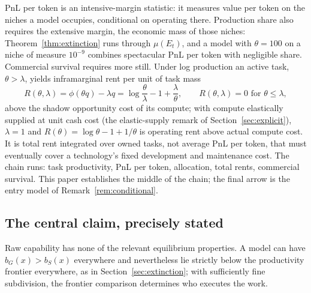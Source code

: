 \documentclass[11pt]{article}
\theoremstyle{definition}
\theoremstyle{remark}
\begin{document}
PnL per token is an intensive-margin statistic: it measures value per token on the niches a model occupies, conditional on operating there. Production share also requires the extensive margin, the economic mass of those niches: Theorem~\ref{thm:extinction} runs through $\mu(E_t)$, and a model with $\theta = 100$ on a niche of measure $10^{-9}$ combines spectacular PnL per token with negligible share. Commercial survival requires more still. Under log production an active task, $\theta > \lambda$, yields inframarginal rent per unit of task mass
\begin{equation}
R(\theta, \lambda) = \phi(\theta q) - \lambda q = \log\frac{\theta}{\lambda} - 1 + \frac{\lambda}{\theta},
\qquad
R(\theta, \lambda) = 0 \text{ for } \theta \le \lambda,
\end{equation}
above the shadow opportunity cost of its compute; with compute elastically supplied at unit cash cost (the elastic-supply remark of Section~\ref{sec:explicit}), $\lambda = 1$ and $R(\theta) = \log\theta - 1 + 1/\theta$ is operating rent above actual compute cost. It is total rent integrated over owned tasks, not average PnL per token, that must eventually cover a technology's fixed development and maintenance cost. The chain runs: task productivity, PnL per token, allocation, total rents, commercial survival. This paper establishes the middle of the chain; the final arrow is the entry model of Remark~\ref{rem:conditional}.

\subsection{The central claim, precisely stated}

Raw capability has none of the relevant equilibrium properties. A model can have $b_G(x) > b_S(x)$ everywhere and nevertheless lie strictly below the productivity frontier everywhere, as in Section~\ref{sec:extinction}; with sufficiently fine subdivision, the frontier comparison determines who executes the work.
\end{document}
